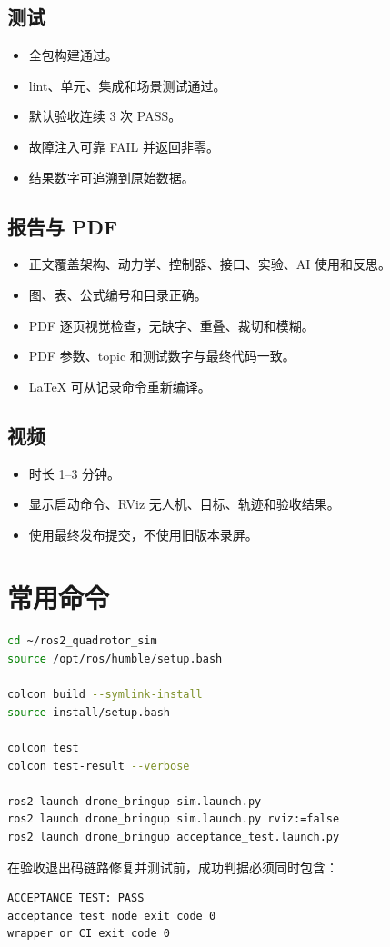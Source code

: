 \documentclass[UTF8,a4paper,12pt,fontset=fandol]{ctexart}
\newcommand{\unchecked}{\(\square\)}
\newcommand{\workitem}[1]{\item[\unchecked] #1}
\begin{document}
\subsection{测试}
\begin{itemize}
  \workitem{全包构建通过。}
  \workitem{lint、单元、集成和场景测试通过。}
  \workitem{默认验收连续 3 次 PASS。}
  \workitem{故障注入可靠 FAIL 并返回非零。}
  \workitem{结果数字可追溯到原始数据。}
\end{itemize}

\subsection{报告与 PDF}
\begin{itemize}
  \workitem{正文覆盖架构、动力学、控制器、接口、实验、AI 使用和反思。}
  \workitem{图、表、公式编号和目录正确。}
  \workitem{PDF 逐页视觉检查，无缺字、重叠、裁切和模糊。}
  \workitem{PDF 参数、topic 和测试数字与最终代码一致。}
  \workitem{LaTeX 可从记录命令重新编译。}
\end{itemize}

\subsection{视频}
\begin{itemize}
  \workitem{时长 1--3 分钟。}
  \workitem{显示启动命令、RViz 无人机、目标、轨迹和验收结果。}
  \workitem{使用最终发布提交，不使用旧版本录屏。}
\end{itemize}

\appendix
\section{常用命令}

\begin{lstlisting}[language=bash]
cd ~/ros2_quadrotor_sim
source /opt/ros/humble/setup.bash

colcon build --symlink-install
source install/setup.bash

colcon test
colcon test-result --verbose

ros2 launch drone_bringup sim.launch.py
ros2 launch drone_bringup sim.launch.py rviz:=false
ros2 launch drone_bringup acceptance_test.launch.py
\end{lstlisting}

在验收退出码链路修复并测试前，成功判据必须同时包含：

\begin{lstlisting}
ACCEPTANCE TEST: PASS
acceptance_test_node exit code 0
wrapper or CI exit code 0
\end{lstlisting}
\end{document}
